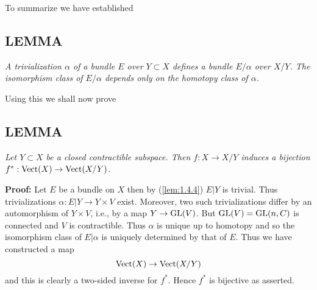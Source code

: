 To summarize we have established \par

\subsection{LEMMA}\label{lem:1.4.7} \textit{A trivialization $\alpha$ of a bundle $E$ over $Y \subset X$ defines a bundle $E/\alpha$ over $X/Y$. The isomorphism class of $E/\alpha$ depends only on the homotopy class of $\alpha$.} \par 

Using this we shall now prove \par

\subsection{LEMMA}\label{lem:1.4.8} \textit{Let $Y \subset X$ be a closed contractible subspace. Then $f: X \to X/Y$ induces a bijection $f^*: \operatorname{Vect}(X) \to \operatorname{Vect}(X/Y)$.} \par 

\textbf{Proof:} Let $E$ be a bundle on $X$ then by (\ref{lem:1.4.4}) $E \vert Y$ is trivial. Thus trivializations $\alpha: E \vert Y \to Y \times V$ exist. Moreover, two such trivializations differ by an automorphism of $Y \times V$, i.e., by a map $Y \to \operatorname{GL}(V)$. But $\operatorname{GL}(V) = \operatorname{GL}(n,C)$ is connected and $V$ is contractible. Thus $\alpha$ is unique up to homotopy and so the isomorphism class of $E \vert \alpha$ is uniquely determined by that of $E$. Thus we have constructed a map
\begin{equation*}
    \operatorname{Vect}(X) \to \operatorname{Vect}(X/Y)
\end{equation*}
and this is clearly a two-sided inverse for $f^*$. Hence $f^*$ is bijective as asserted. \par 


